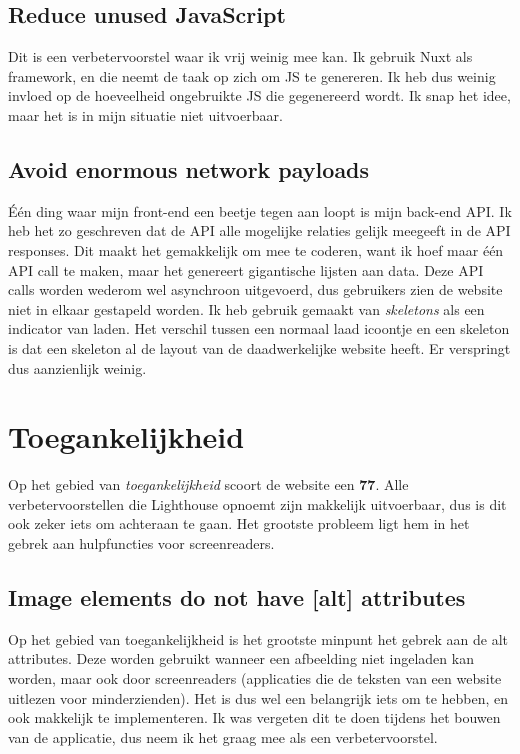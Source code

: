 \documentclass[a4paper]{report}
\begin{document}
    \subsection{Reduce unused JavaScript}
    Dit is een verbetervoorstel waar ik vrij weinig mee kan. Ik gebruik Nuxt als framework, en die neemt de taak op zich om JS te genereren.
    Ik heb dus weinig invloed op de hoeveelheid ongebruikte JS die gegenereerd wordt. Ik snap het idee, maar het is in mijn situatie niet uitvoerbaar.

    \subsection{Avoid enormous network payloads}
    Één ding waar mijn front-end een beetje tegen aan loopt is mijn back-end API. Ik heb het zo geschreven dat de API alle mogelijke relaties gelijk
    meegeeft in de API responses. Dit maakt het gemakkelijk om mee te coderen, want ik hoef maar één API call te maken, maar het genereert gigantische
    lijsten aan data. Deze API calls worden wederom wel asynchroon uitgevoerd, dus gebruikers zien de website niet in elkaar gestapeld worden.
    Ik heb gebruik gemaakt van \textit{skeletons} als een indicator van laden. Het verschil tussen een normaal laad icoontje en een skeleton is dat een skeleton
    al de layout van de daadwerkelijke website heeft. Er verspringt dus aanzienlijk weinig.

    \section{Toegankelijkheid}
    Op het gebied van \textit{toegankelijkheid} scoort de website een \textbf{77}.
    Alle verbetervoorstellen die Lighthouse opnoemt zijn makkelijk uitvoerbaar, dus is dit ook zeker iets om achteraan te gaan.
    Het grootste probleem ligt hem in het gebrek aan hulpfuncties voor screenreaders.

    \subsection{Image elements do not have [alt] attributes}
    Op het gebied van toegankelijkheid is het grootste minpunt het gebrek aan de {\selectfont alt} attributes.
    Deze worden gebruikt wanneer een afbeelding niet ingeladen kan worden, maar ook door screenreaders (applicaties die de teksten van een website uitlezen voor minderzienden).
    Het is dus wel een belangrijk iets om te hebben, en ook makkelijk te implementeren. Ik was vergeten dit te doen tijdens het bouwen van de applicatie, dus neem ik het graag mee
    als een verbetervoorstel.
\end{document}
